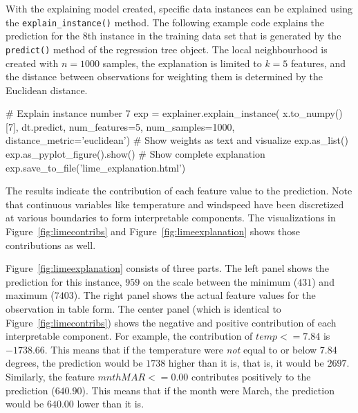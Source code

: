With the explaining model created, specific data instances can be explained using the \texttt{explain\_instance()} method. The following example code explains the prediction for the 8th instance in the training data set that is generated by the \texttt{predict()} method of the regression tree object. The local neighbourhood is created with $n=1000$ samples, the explanation is limited to $k=5$ features, and the distance between observations for weighting them is determined by the Euclidean distance.

\begin{samepage}
\begin{pythoncode}
# Explain instance number 7
exp = explainer.explain_instance( 
    x.to_numpy()[7], 
    dt.predict, 
    num_features=5, 
    num_samples=1000, 
    distance_metric='euclidean')
# Show weights as text and visualize
exp.as_list()
exp.as_pyplot_figure().show()
# Show complete explanation
exp.save_to_file('lime_explanation.html')
\end{pythoncode}
\end{samepage}

The results indicate the contribution of each feature value to the prediction. Note that continuous variables like temperature and windspeed have been discretized at various boundaries to form interpretable components. The visualizations in Figure~\ref{fig:limecontribs} and Figure~\ref{fig:limeexplanation} shows those contributions as well. 

\begin{samepage}
\begin{textcode}
[('temp <= 7.84', -1738.6611673589232), 
 ('mnth_MAR <= 0.00', 640.903016649792), 
 ('weekday_THU <= 0.00', -532.3918204920352), 
 ('windspeed > 15.63', 493.90993722141997), 
 ('season_SPRING <= 0.00', -333.38496260796086)]
\end{textcode}
\end{samepage}

Figure~\ref{fig:limeexplanation} consists of three parts. The left panel shows the prediction for this instance, $959$ on the scale between the minimum ($431$) and maximum ($7403$). The right panel shows the actual feature values for the observation in table form. The center panel (which is identical to Figure~\ref{fig:limecontribs}) shows the negative and positive contribution of each interpretable component. For example, the contribution of $temp <= 7.84$ is $-1738.66$. This means that if the temperature were \emph{not} equal to or below 7.84 degrees, the prediction would be $1738$ higher than it is, that is, it would be $2697$. Similarly, the feature $mnth MAR <= 0.00$ contributes positively to the prediction ($640.90$). This means that if the month were March, the prediction would be $640.00$ lower than it is. 

